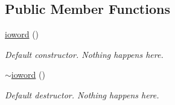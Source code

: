 \subsection*{Public Member Functions}
\begin{DoxyCompactItemize}
\item 
\hyperlink{classosea_1_1ofreq_1_1ioword_a80133d44962325bf247e7c33699d8194}{ioword} ()
\begin{DoxyCompactList}\small\item\em Default constructor. Nothing happens here. \end{DoxyCompactList}\item 
\hyperlink{classosea_1_1ofreq_1_1ioword_a4f5ba051cef21e0b72c42e80d7590f2b}{$\sim$ioword} ()
\begin{DoxyCompactList}\small\item\em Default destructor. Nothing happens here. \end{DoxyCompactList}\end{DoxyCompactItemize}
